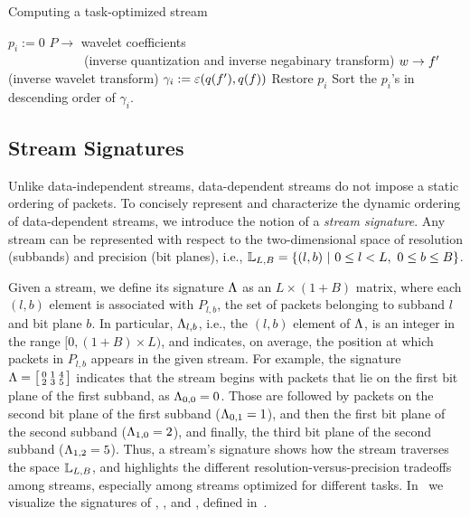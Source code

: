 \begin{algorithm}[h]
  \caption{Computing a task-optimized stream}
  \begin{algorithmic}[1]
			\State $p_i := 0$
      \State $P \rightarrow$ wavelet coefficients \wcof \\
      		\ \ \ \ \ \ \ \ \ \ \ \ (inverse quantization and inverse negabinary transform)
			\State $\wcof \rightarrow f'$ (inverse wavelet transform)
			\State $\gamma_i := \err(q(f'),q(f))$			
			\State Restore $p_i$
		\EndFor
		\State Sort the $p_i$'s in descending order of $\gamma_i$.
	\end{algorithmic}
	\label{alg:greedy}
\end{algorithm}

\subsection{Stream Signatures} \label{sec:stream-signature}
Unlike data-independent streams, data-dependent streams do not impose a static ordering of packets.
To concisely represent and characterize the dynamic ordering of data-dependent streams, we introduce
the notion of a \emph{stream signature}. Any stream can be represented with respect to the
two-dimensional space of resolution (subbands) and precision (bit
planes), i.e., \mbox{${\mathbb L}_{L,B}=\{(l,b)\ |\ 0\leq l < L,\ 0\leq b \leq B\}$.}

Given a stream, we define its signature $\sgn$ as an $L \times (1+B)$ matrix, where each $(l,b)$
element is associated with $P_{l,b}$, the set of packets belonging to subband $l$ and bit plane
$b$. In particular, $\sgn_{l,b}$, i.e., the $(l,b)$ element of $\sgn$, is an integer in the range
$[0, (1+B)\times L)$, and indicates, on average, the position at which packets in $P_{l,b}$ appears
in the given stream. For example, the signature $\sgn=\bigl[ \begin{smallmatrix}0 & 1 & 4\\
2 & 3 & 5\end{smallmatrix}\bigr]$ indicates that the stream begins with packets that lie on the
first bit plane of the first subband, as $\sgn_{0,0}=0$. Those are followed by packets on the second
bit plane of the first subband ($\sgn_{0,1}=1$), and then the first bit plane of the second subband
($\sgn_{1,0}=2$), and finally, the third bit plane of the second subband ($\sgn_{1,2}=5$). Thus, a
stream's signature shows how the stream traverses the space ${\mathbb L}_{L,B}$, and highlights the
different resolution-versus-precision tradeoffs among streams, especially among \sopt streams
optimized for different tasks. In~ we visualize the signatures of
\sbit, \slvl, and \swav, defined in~.

